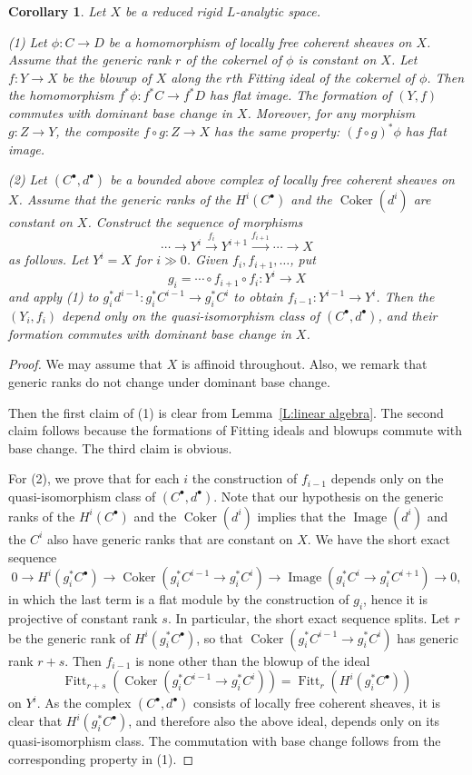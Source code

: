 \documentclass[12pt]{article}
\newtheorem{cor}[theorem]{Corollary}
\theoremstyle{definition}
\numberwithin{equation}{theorem}
\DeclareMathOperator{\Coker}{Coker}
\DeclareMathOperator{\Fitt}{Fitt}
\DeclareMathOperator{\Image}{Image}
\begin{document}
\begin{cor}
\label{C:flattening technique}
Let $X$ be a reduced rigid $L$-analytic space.

(1) Let $\phi: C \to D$ be a homomorphism of locally free coherent sheaves on $X$.
Assume that the generic rank $r$ of the cokernel of $\phi$ is constant on $X$.
Let $f: Y \to X$ be the blowup of $X$ along the $r$th Fitting ideal of the cokernel of $\phi$.
Then the homomorphism $f^*\phi: f^*C \to f^*D$ has flat image.
The formation of $(Y,f)$ commutes with dominant base change in $X$.
Moreover, for any morphism $g: Z \to Y$, the composite $f \circ g: Z \to X$ has the same property: $(f \circ g)^*\phi$ has flat image.

(2) Let $(C^\bullet, d^\bullet)$ be a bounded above complex of locally
free coherent sheaves on $X$.  Assume that the generic ranks of the
$H^i(C^\bullet)$ and the $\Coker(d^i)$ are constant on $X$.  Construct
the sequence of morphisms
\[
\cdots \to Y^i \xrightarrow{f_i} Y^{i+1} \xrightarrow{f_{i+1}} \cdots \to X
\]
as follows.  Let $Y^i = X$ for $i \gg 0$.  Given $f_i,f_{i+1},\ldots$, put
\[
g_i = \cdots \circ f_{i+1} \circ f_i: Y^i \longrightarrow X
\]
and apply (1) to $g_i^*d^{i-1}: g_i^*C^{i-1} \to g_i^*C^i$ to obtain $f_{i-1}: Y^{i-1} \to Y^i$.  Then the $(Y_i,f_i)$ depend only on the quasi-isomorphism class of $(C^\bullet,d^\bullet)$, and their formation commutes with dominant base change in $X$.
\end{cor}
\begin{proof}
We may assume that $X$ is affinoid throughout.  Also, we remark that
generic ranks do not change under dominant base change.

Then the first claim of (1) is clear from Lemma~\ref{L:linear
  algebra}.  The second claim follows because the formations of
Fitting ideals and blowups commute with base change.  The third claim
is obvious.

For (2), we prove that for each $i$ the construction of $f_{i-1}$
depends only on the quasi-isomorphism class of
$(C^\bullet,d^\bullet)$.  Note that our hypothesis on the generic
ranks of the $H^i(C^\bullet)$ and the $\Coker(d^i)$ implies that the
$\Image(d^i)$ and the $C^i$ also have generic ranks that are
constant on $X$.  We have the short exact sequence
\[
0 \to H^i(g_i^*C^\bullet) \to \Coker(g_i^*C^{i-1} \to g_i^*C^i) \to \Image(g_i^*C^i \to g_i^*C^{i+1}) \to 0,
\]
in which the last term is a flat module by the construction of $g_i$,
hence it is projective of constant rank $s$.  In particular, the short
exact sequence splits.  Let $r$ be the generic rank of
$H^i(g_i^*C^\bullet)$, so that $\Coker(g_i^*C^{i-1} \to g_i^*C^i)$ has
generic rank $r+s$.  Then $f_{i-1}$ is none other than the blowup of
the ideal
\[
\Fitt_{r+s}(\Coker(g_i^*C^{i-1} \to g_i^*C^i)) = \Fitt_r(H^i(g_i^*C^\bullet))
\]
on $Y^i$.  As the complex $(C^\bullet,d^\bullet)$ consists of locally
free coherent sheaves, it is clear that $H^i(g_i^*C^\bullet)$, and
therefore also the above ideal, depends only on its quasi-isomorphism
class.  The commutation with base change follows from the
corresponding property in (1).
\end{proof}
\end{document}
